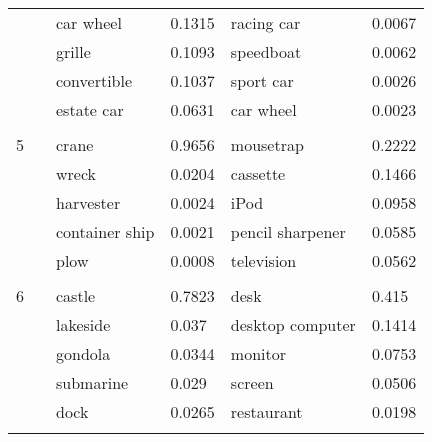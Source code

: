 \begin{tabular}{llllll}
  & {} &             car wheel &  0.1315 &           racing car &  0.0067 \\
  & {} &                grille &  0.1093 &            speedboat &  0.0062 \\
  & {} &           convertible &  0.1037 &            sport car &  0.0026 \\
  & {} &            estate car &  0.0631 &            car wheel &  0.0023 \\
  & {} &                       &         &                      &         \\
5 & {} &                 crane &  0.9656 &            mousetrap &  0.2222 \\
  & {} &                 wreck &  0.0204 &             cassette &  0.1466 \\
  & {} &             harvester &  0.0024 &                 iPod &  0.0958 \\
  & {} &        container ship &  0.0021 &     pencil sharpener &  0.0585 \\
  & {} &                  plow &  0.0008 &           television &  0.0562 \\
  & {} &                       &         &                      &         \\
6 & {} &                castle &  0.7823 &                 desk &   0.415 \\
  & {} &              lakeside &   0.037 &     desktop computer &  0.1414 \\
  & {} &               gondola &  0.0344 &              monitor &  0.0753 \\
  & {} &             submarine &   0.029 &               screen &  0.0506 \\
  & {} &                  dock &  0.0265 &           restaurant &  0.0198 \\
  & {} &                       &         &                      &         \\
\bottomrule
\end{tabular}

